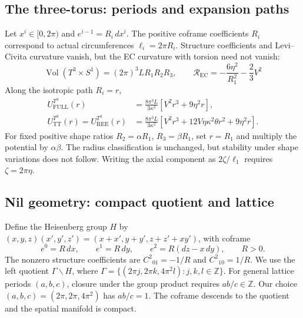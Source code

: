 \subsection{The three-torus: periods and expansion paths}
Let $x^i\in[0,2\pi)$ and $e^{i-1}=R_i\,dx^i$.
The positive coframe coefficients $R_i$ correspond to actual circumferences
$\ell_i=2\pi R_i$. Structure coefficients and Levi--Civita curvature vanish,
but the EC curvature with torsion need not vanish:
\begin{equation}
\operatorname{Vol}(T^3\times S^1)=(2\pi)^3LR_1R_2R_3,\qquad
\mathcal R_{\mathrm{EC}}=-\frac{6\eta^2}{R_1^2}-\frac23V^2
\tag{M3-05}\label{eq:M3-05}
\end{equation}
Along the isotropic path $R_i=r$,
\begin{equation}
\begin{aligned}
U^{T^3}_{\mathrm{FULL}}(r)
 &=\frac{8\pi^3L}{3\kappa^2}\left[V^2r^3+9\eta^2r\right],\\
U^{T^3}_{\mathrm{TT}}(r)=U^{T^3}_{\mathrm{REE}}(r)
 &=\frac{8\pi^3L}{3\kappa^2}
   \left[V^2r^3+12V\eta\kappa^2\theta r^2+9\eta^2r\right].
\end{aligned}
\tag{M3-06}\label{eq:M3-06}
\end{equation}
For fixed positive shape ratios $R_2=\alpha R_1$, $R_3=\beta R_1$,
set $r=R_1$ and multiply the potential by $\alpha\beta$.
The radius classification is unchanged, but stability under shape
variations does not follow. Writing the axial component as
$2\zeta/\ell_1$ requires $\zeta=2\pi\eta$.

\subsection{Nil geometry: compact quotient and lattice}
Define the Heisenberg group $H$ by
$(x,y,z)(x',y',z')=(x+x',y+y',z+z'+xy')$, with coframe
\begin{equation}
e^0=R\,dx,\qquad e^1=R\,dy,\qquad
e^2=R(dz-x\,dy),\qquad R>0.
\tag{M3-07}\label{eq:M3-07}
\end{equation}
The nonzero structure coefficients are $C^2{}_{01}=-1/R$ and
$C^2{}_{10}=1/R$. We use the left quotient $\Gamma\backslash H$,
where
$\Gamma=\{(2\pi j,2\pi k,4\pi^2l):j,k,l\in\mathbb Z\}$.
For general lattice periods $(a,b,c)$, closure under the group product
requires $ab/c\in\mathbb Z$. Our choice
$(a,b,c)=(2\pi,2\pi,4\pi^2)$ has $ab/c=1$.
The coframe descends to the quotient and the spatial manifold is compact.

